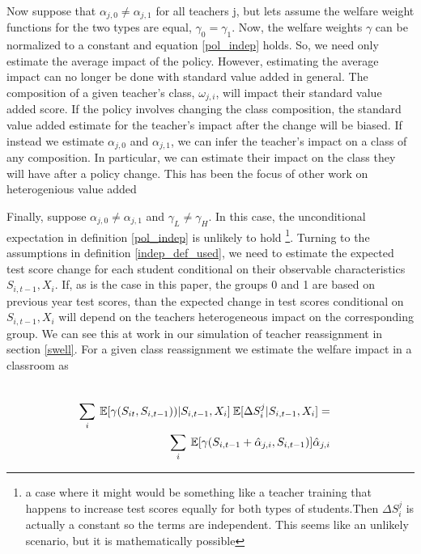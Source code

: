 \documentclass[12pt]{article}
\theoremstyle{definition}
\theoremstyle{definition}
\theoremstyle{definition}
\theoremstyle{definition}
\begin{document}
    Now suppose that $\alpha_{j,0} \neq \alpha_{j,1}$ for all teachers j, but lets assume the welfare weight functions for the two types are equal, $\gamma_0 = \gamma_1$. Now, the welfare weights $\gamma$ can be normalized to a constant and equation \ref{pol_indep} holds. So, we need only estimate the average impact of the policy. However, estimating the average impact can no longer be done with standard value added in general. The composition of a given teacher's class, $\omega_{j,i}$, will impact their standard value added score. If the policy involves changing the class composition, the standard value added estimate for the teacher's impact after the change will be biased. If instead we estimate $\alpha_{j,0}$ and $\alpha_{j,1}$, we can infer the teacher's impact on a class of any composition. In particular, we can estimate their impact on the class they will have after a policy change. This has been the focus of other work on heterogenious value added \citep{ahn2021importance, Delgado2020}
    
    Finally, suppose $\alpha_{j,0} \neq \alpha_{j,1}$ and $\gamma_L \neq \gamma_H$. In this case, the unconditional expectation in definition \ref{pol_indep} is unlikely to hold \footnote{a case where it might would be something like a teacher training that happens to increase test scores equally for both types of students.Then $\Delta S_i^j$ is actually a constant so the terms are independent. This seems like an unlikely scenario, but it is mathematically possible}. Turning to the assumptions in definition \ref{indep_def_used}, we need to estimate the expected test score change for each student conditional on their observable characteristics $S_{i,t-1}, X_i$. If, as is the case in this paper, the groups 0 and 1 are based on previous year test scores, than the expected change in test scores conditional on $S_{i,t-1}, X_i$ will depend on the teachers heterogeneous impact on the corresponding group. We can see this at work in our simulation of teacher reassignment in section \ref{swell}. For a given class reassignment we estimate the welfare impact in a classroom as 
    
    \begin{align}
      \\ \sum_i \: \mathbb{E}[\gamma(S_{it}, S_{i,t-1}))|S_{i,t-1},  X_i] \:\mathbb{E}[\Delta S_i^j|S_{i,t-1},  X_i]  = &
      \\ \sum_i \: \mathbb{E}[\gamma(S_{i,t-1} + \hat{\alpha}_{j,i}, S_{i,t-1})] \hat{\alpha}_{j,i}
    \end{align}
\end{document}
